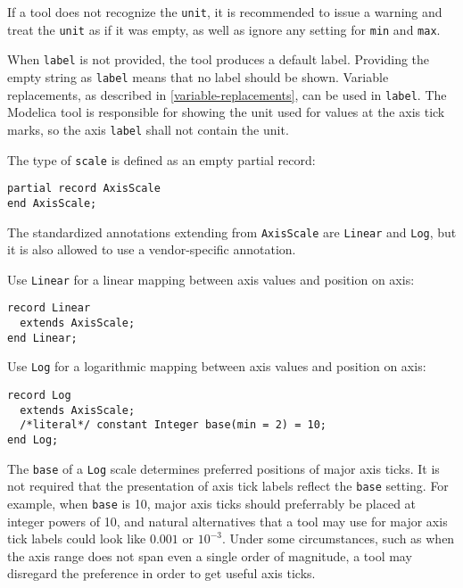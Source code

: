 If a tool does not recognize the \lstinline!unit!, it is recommended to issue a warning and treat the \lstinline!unit! as if it was empty, as well as ignore any setting for \lstinline!min! and \lstinline!max!.

When \lstinline!label! is not provided, the tool produces a default label.
Providing the empty string as \lstinline!label! means that no label should be shown.
Variable replacements, as described in \cref{variable-replacements}, can be used in \lstinline!label!.
The Modelica tool is responsible for showing the unit used for values at the axis tick marks, so the axis \lstinline!label! shall not contain the unit.

The type of \lstinline!scale! is defined as an empty partial record:
\begin{lstlisting}[language=modelica]
partial record AxisScale
end AxisScale;
\end{lstlisting}%

The standardized annotations extending from \lstinline!AxisScale! are \lstinline!Linear! and  \lstinline!Log!, but it is also allowed to use a vendor-specific annotation.

Use \lstinline!Linear! for a linear mapping between axis values and position on axis:
\begin{lstlisting}[language=modelica]
record Linear
  extends AxisScale;
end Linear;
\end{lstlisting}%

Use \lstinline!Log! for a logarithmic mapping between axis values and position on axis:
\begin{lstlisting}[language=modelica]
record Log
  extends AxisScale;
  /*literal*/ constant Integer base(min = 2) = 10;
end Log;
\end{lstlisting}%

The \lstinline!base! of a \lstinline!Log! scale determines preferred positions of major axis ticks.
It is not required that the presentation of axis tick labels reflect the \lstinline!base! setting.
For example, when \lstinline!base! is 10, major axis ticks should preferrably be placed at integer powers of 10, and natural alternatives that a tool may use for major axis tick labels could look like $0.001$ or $10^{-3}$.
Under some circumstances, such as when the axis range does not span even a single order of magnitude, a tool may disregard the preference in order to get useful axis ticks.

